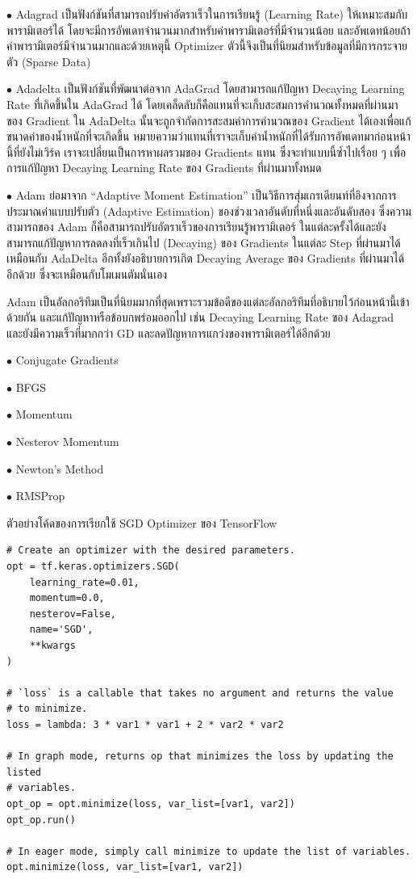\noindent $\bullet$ Adagrad เป็นฟังก์ชันที่สามารถปรับค่าอัตราเร็วในการเรียนรู้ (Learning Rate) ให้เหมาะสมกับพารามิเตอร์ได้ 
โดยจะมีการอัพเดทจำนวนมากสำหรับค่าพารามิเตอร์ที่มีจำนวนน้อย และอัพเดทน้อยถ้าค่าพารามิเตอร์มีจำนวนมากและด้วยเหตุนี้ Optimizer 
ตัวนี้จึงเป็นที่นิยมสำหรับข้อมูลที่มีการกระจายตัว (Sparse Data)

\noindent $\bullet$ Adadelta เป็นฟังก์ชันที่พัฒนาต่อจาก AdaGrad โดยสามารถแก้ปัญหา Decaying Learning Rate ที่เกิดขึ้นใน 
AdaGrad ได้ โดยเคล็ดลับก็คือแทนที่จะเก็บสะสมการคำนวณทั้งหมดที่ผ่านมาของ Gradient ใน AdaDelta นั้นจะถูกจำกัดการสะสมค่าการคำนวณของ 
Gradient ได้เองเพื่อแก้ขนาดค่าของน้ำหนักที่จะเกิดขึ้น หมายความว่าแทนที่เราจะเก็บค่าน้ำหนักที่ได้รับการอัพเดทมาก่อนหน้านี้ที่ยังไม่เวิร์ค 
เราจะเปลี่ยนเป็นการหาผลรวมของ Gradients แทน ซึ่งจะทำแบบนี้ซ้ำไปเรื่อย ๆ เพื่อการแก้ปัญหา Decaying Learning Rate ของ Gradients 
ที่ผ่านมาทั้งหมด

\noindent $\bullet$ Adam ย่อมาจาก \enquote{Adaptive Moment Estimation} เป็นวิธีการสุ่มเกรเดียนท์ที่อิงจากการประมาณค่าแบบปรับตัว 
(Adaptive Estimation) ของช่วงเวลาอันดับที่หนึ่งและอันดับสอง ซึ่งความสามารถของ Adam ก็คือสามารถปรับอัตราเร็วของการเรียนรู้พารามิเตอร์%
ในแต่ละครั้งได้และยังสามารถแก้ปัญหาการลดลงที่เร็วเกินไป (Decaying) ของ Gradients ในแต่ละ Step ที่ผ่านมาได้เหมือนกับ AdaDelta 
อีกทั้งยังอธิบายการเกิด Decaying Average ของ Gradients ที่ผ่านมาได้อีกด้วย ซึ่งจะเหมือนกับโมเมนตัมนั่นเอง

Adam เป็นอัลกอริทึมเป็นที่นิยมมากที่สุดเพราะรวมข้อดีของแต่ละอัลกอริทึมที่อธิบายไว้ก่อนหน้านี้เข้าด้วยกัน และแก้ปัญหาหรือข้อบกพร่อมออกไป 
เช่น Decaying Learning Rate ของ Adagrad และยังมีความเร็วที่มากกว่า GD และลดปัญหาการแกว่งของพารามิเตอร์ได้อีกด้วย

\noindent $\bullet$ Conjugate Gradients

\noindent $\bullet$ BFGS

\noindent $\bullet$ Momentum

\noindent $\bullet$ Nesterov Momentum

\noindent $\bullet$ Newton's Method

\noindent $\bullet$ RMSProp


ตัวอย่างโค้ดของการเรียกใช้ SGD Optimizer ของ TensorFlow

\begin{lstlisting}[style=MyPython]
# Create an optimizer with the desired parameters.
opt = tf.keras.optimizers.SGD(
    learning_rate=0.01,
    momentum=0.0,
    nesterov=False,
    name='SGD',
    **kwargs
)

# `loss` is a callable that takes no argument and returns the value
# to minimize.
loss = lambda: 3 * var1 * var1 + 2 * var2 * var2

# In graph mode, returns op that minimizes the loss by updating the listed
# variables.
opt_op = opt.minimize(loss, var_list=[var1, var2])
opt_op.run()

# In eager mode, simply call minimize to update the list of variables.
opt.minimize(loss, var_list=[var1, var2])
\end{lstlisting}

